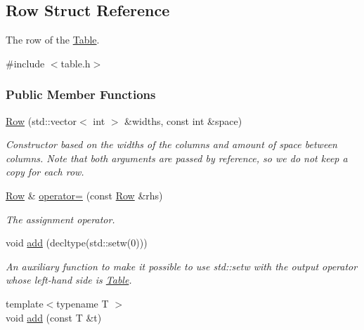 \hypertarget{structRow}{}\subsection{Row Struct Reference}
\label{structRow}


The row of the \hyperlink{structTable}{Table}.  




{\ttfamily \#include $<$table.\+h$>$}

\subsubsection*{Public Member Functions}
\begin{DoxyCompactItemize}
\item 
\hyperlink{structRow_a7b27df03c3bf36362f2c7631d72c562d}{Row} (std\+::vector$<$ int $>$ \&widths, const int \&space)
\begin{DoxyCompactList}\small\item\em Constructor based on the widths of the columns and amount of space between columns. Note that both arguments are passed by reference, so we do not keep a copy for each row. \end{DoxyCompactList}\item 
\hyperlink{structRow}{Row} \& \hyperlink{structRow_ac69654d7e36c2b1c76ac64ce01d88a76}{operator=} (const \hyperlink{structRow}{Row} \&rhs)
\begin{DoxyCompactList}\small\item\em The assignment operator. \end{DoxyCompactList}\item 
void \hyperlink{structRow_a05797f4ef428f5d79349abdaf9bd05fe}{add} (decltype(std\+::setw(0)))\hypertarget{structRow_a05797f4ef428f5d79349abdaf9bd05fe}{}\label{structRow_a05797f4ef428f5d79349abdaf9bd05fe}

\begin{DoxyCompactList}\small\item\em An auxiliary function to make it possible to use {\ttfamily std\+::setw} with the output operator whose left-\/hand side is \hyperlink{structTable}{Table}. \end{DoxyCompactList}\item 
{\footnotesize template$<$typename T $>$ }\\void \hyperlink{structRow_a97267c435f17c7e9ec3a3f7f769028dc}{add} (const T \&t)\hypertarget{structRow_a97267c435f17c7e9ec3a3f7f769028dc}{}\label{structRow_a97267c435f17c7e9ec3a3f7f769028dc}


\end{DoxyCompactItemize}
